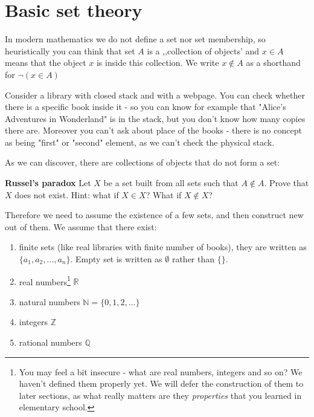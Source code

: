 \section{Basic set theory}
\label{sec:basic_set_theory}

In modern mathematics we do not define a set nor set membership, so heuristically you can think that set $A$
is a ,,collection of objects' and $x\in A$ means that the object $x$ is inside this collection.
We write $x\notin A$ as a shorthand for $\neg (x\in A)$

\begin{example}
  Consider a library with closed stack and with a webpage. You can check whether there is a specific book inside it -
  so you can know for example that "Alice's Adventures in Wonderland"
  is in the stack, but you don't know how many copies there are. Moreover you can't ask about place of the books - there is no concept as being "first" or "second" element,
  as we can't check the physical stack.
\end{example}

As we can discover, there are collections of objects that do not form a set:
\begin{prob}
  \textbf{Russel's paradox}
  Let $X$ be a set built from all sets such that $A\notin A.$ Prove that $X$ does not exist. Hint: what if $X\in X$? What if $X\notin X$?
\end{prob}

Therefore we need to assume the existence of a few sets, and then construct new out of them. We assume that there exist:
\begin{enumerate}
  \item finite sets (like real libraries with finite number of books), they are written as $\{a_1,a_2,\dots,a_n\}$. Empty set is written as $\emptyset$ rather than $\{\}$.
	\item real numbers\footnote{You may feel a bit insecure - what are real numbers, integers and so on? We haven't defined them properly yet.
    We will defer the construction of them to later sections, as what really matters are they \textit{properties} that you learned in elementary school.} $\mathbb R$
	\item natural numbers $\mathbb N=\{0,1,2,\dots\}$
	\item integers $\mathbb Z$
	\item rational numbers $\mathbb Q$
\end{enumerate}

